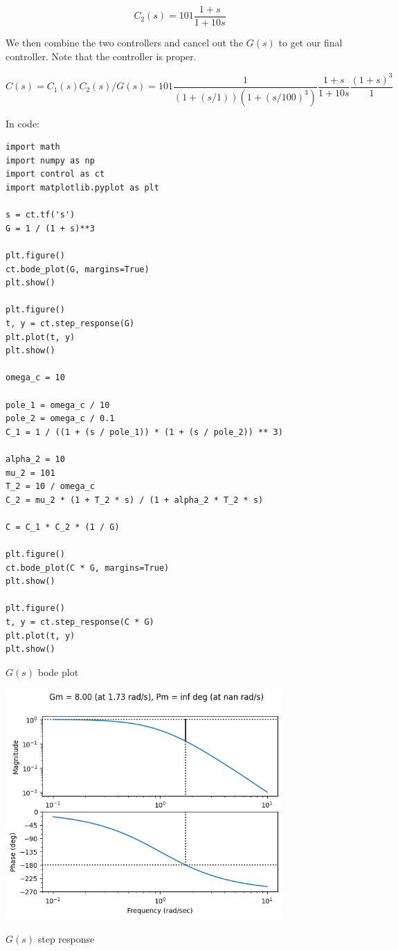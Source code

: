\documentclass[11pt]{article}
\begin{document}
\[ C_2(s) = 101 \dfrac{1 + s}{1 + 10s} \]

We then combine the two controllers and cancel out the $G(s)$ to get our final controller. Note that the controller is proper.

\[ C(s) = C_1(s) C_2(s) / G(s) = 101 \dfrac{1}{(1 + (s / 1)) (1 + (s / 100)^3)} \dfrac{1 + s}{1 + 10s} \dfrac{(1 + s)^3}{1} \]

In code:

\begin{verbatim}
import math
import numpy as np
import control as ct
import matplotlib.pyplot as plt

s = ct.tf('s')
G = 1 / (1 + s)**3

plt.figure()
ct.bode_plot(G, margins=True)
plt.show()

plt.figure()
t, y = ct.step_response(G)
plt.plot(t, y)
plt.show()

omega_c = 10

pole_1 = omega_c / 10
pole_2 = omega_c / 0.1
C_1 = 1 / ((1 + (s / pole_1)) * (1 + (s / pole_2)) ** 3)

alpha_2 = 10
mu_2 = 101
T_2 = 10 / omega_c
C_2 = mu_2 * (1 + T_2 * s) / (1 + alpha_2 * T_2 * s)

C = C_1 * C_2 * (1 / G)

plt.figure()
ct.bode_plot(C * G, margins=True)
plt.show()

plt.figure()
t, y = ct.step_response(C * G)
plt.plot(t, y)
plt.show()
\end{verbatim}

$G(s)$ bode plot

\includegraphics[width=300pt]{a5_1.png}

$G(s)$ step response
\end{document}
